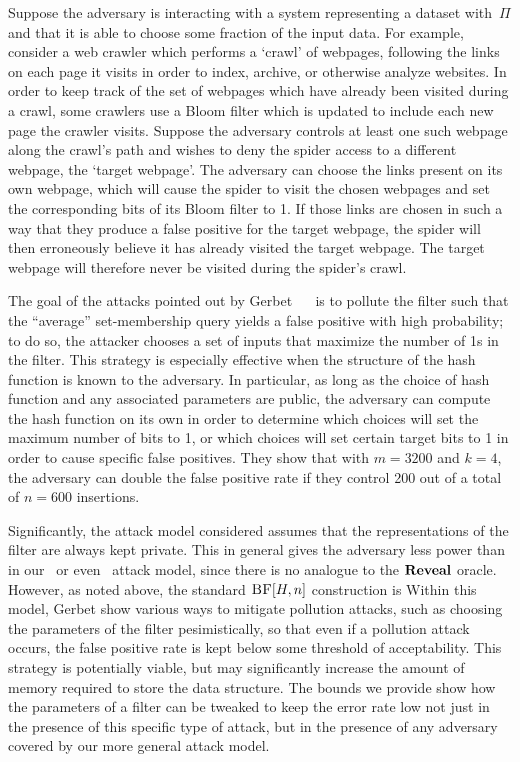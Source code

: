 Suppose the adversary is interacting with a system representing a dataset
with~$\Pi$ and that it is able to choose some fraction of the input data.  For
example, consider a web crawler which performs a `crawl' of webpages, following
the links on each page it visits in order to index, archive, or otherwise
analyze websites. In order to keep track of the set of webpages which have
already been visited during a crawl, some crawlers use a Bloom filter which is
updated to include each new page the crawler visits. Suppose the adversary
controls at least one such webpage along the crawl's path and wishes to deny the
spider access to a different webpage, the `target webpage'. The adversary can
choose the links present on its own webpage, which will cause the spider to
visit the chosen webpages and set the corresponding bits of its Bloom filter to
1. If those links are chosen in such a way that they produce a false positive
for the target webpage, the spider will then erroneously believe it has already
visited the target webpage. The target webpage will therefore never be visited
during the spider's crawl.

%
The goal of the attacks pointed out by Gerbet \etal~~\cite{gerbet2015power} is
to pollute the filter such that the ``average'' set-membership query yields a
false positive with high probability; to do so, the attacker chooses a set of
inputs that maximize the number of 1s in the filter. This strategy is especially
effective when the structure of the hash function is known to the adversary. In
particular, as long as the choice of hash function and any associated parameters
are public, the adversary can compute the hash function on its own in order to
determine which choices will set the maximum number of bits to 1, or which
choices will set certain target bits to 1 in order to cause specific false
positives. They show that with $m = 3200$ and $k = 4$, the adversary can double
the false positive rate if they control 200 out of a total of $n = 600$
insertions.

Significantly, the attack model considered assumes that the representations of
the filter are always kept private. This in general gives the adversary less
power than in our \errep\ or even \erreps\ attack model, since there is no
analogue to the $\mathbf{Reveal}$ oracle. However, as noted above, the standard $\textnormal{\textsc{BF}}[H,n]$
construction is  Within this model, Gerbet \etal show various
ways to mitigate pollution attacks, such as choosing the parameters of the filter pesimistically,
so that even if a pollution attack occurs, the false positive rate is kept below
some threshold of acceptability. This strategy is  potentially viable, but may
significantly increase the amount of memory required to store the data structure.
The bounds we provide show how the parameters of a filter can be tweaked to keep
the error rate low not just in the presence of this specific type of attack, but
in the presence of any adversary covered by our more general attack model.

